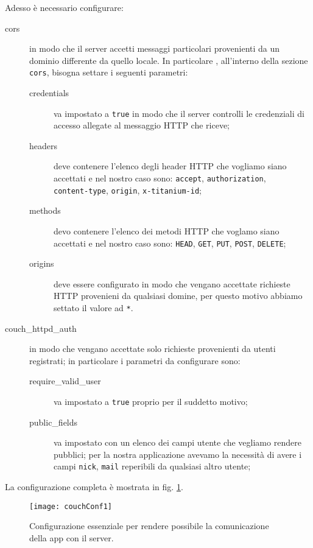         \noindent Adesso è necessario configurare:
        \begin{description}
            \item[cors] in modo che il server accetti messaggi \html{} 
            particolari provenienti da un dominio differente da quello locale. 
            In particolare , all'interno della sezione \texttt{cors}, bisogna 
            settare i seguenti parametri:
            \begin{description}
                \item[credentials] va impostato a \texttt{true} in modo che il 
                server controlli le credenziali di accesso allegate al 
                messaggio HTTP che riceve;
                \item[headers] deve contenere l'elenco degli header HTTP che 
                vogliamo siano accettati e nel nostro caso sono: 
                \texttt{accept}, \texttt{authorization},\\
                \texttt{content-type}, \texttt{origin}, \texttt{x-titanium-id};
                \item[methods] devo contenere l'elenco dei metodi HTTP che 
                voglamo siano accettati e nel nostro caso sono: \texttt{HEAD}, 
                \texttt{GET}, \texttt{PUT}, \texttt{POST}, \texttt{DELETE};
                \item[origins] deve essere configurato in modo che vengano 
                accettate richieste HTTP provenieni da qualsiasi domine, per 
                questo motivo abbiamo settato il valore ad \texttt{*}.
            \end{description}
            \item[couch\_httpd\_auth] in modo che vengano accettate solo richieste 
            provenienti da utenti registrati; in particolare i parametri da 
            configurare sono:
                \begin{description}
                    \item[require\_valid\_user] va impostato a \texttt{true} 
                    proprio per il suddetto motivo;
                    \item[public\_fields] va impostato con un elenco dei campi 
                    utente che vegliamo rendere pubblici; per la nostra 
                    applicazione avevamo la necessità di avere i campi 
                    \texttt{nick}, \texttt{mail} reperibili da qualsiasi altro utente;
                \end{description}
        \end{description}
        La configurazione completa è mostrata in fig. \ref{fig:confCouch1}.
        \begin{figure}[H]
            \centering
            \texttt{[image: couchConf1]}
            \caption{
                Configurazione essenziale per rendere possibile la comunicazione
                della app con il server.
            }
            \label{fig:confCouch1}
        \end{figure}
